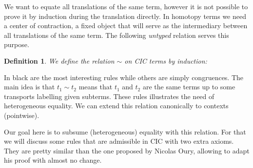 \documentclass[11pt]{article}
\theoremstyle{plain}
\newtheorem{definition}[theorem]{Definition}
\theoremstyle{remark}
\begin{document}
We want to equate all translations of the same term, however it is not possible
to prove it by induction during the translation directly. In homotopy terms
we need a center of contraction, \ie a fixed object that will serve as the
intermediary between all translations of the same term.
The following \emph{untyped} relation serves this purpose.

\begin{definition}
  We define the relation $\sim$ on CIC terms by induction:
  \begin{mathc}
    {\color{gray}
    }
    \qquad
    \qquad
    \qquad
    {\color{gray}
    }
  \end{mathc}
  \begin{mathc}
    \color{gray}
    \qquad
  \end{mathc}
\end{definition}

In black are the most interesting rules while others are simply congruences.
The main idea is that $t_1 \sim t_2$ means that $t_1$ and $t_2$ are the same
terms up to some transports labelling given subterms.
These rules illustrates the need of heterogeneous equality.
We can extend this relation canonically to contexts (pointwise).

Our goal here is to subsume (heterogeneous) equality with this relation.
For that we will discuss some rules that are admissible in CIC with two extra
axioms. They are pretty similar than the one proposed by Nicolas Oury, allowing
to adapt his proof with almost no change.
\end{document}
